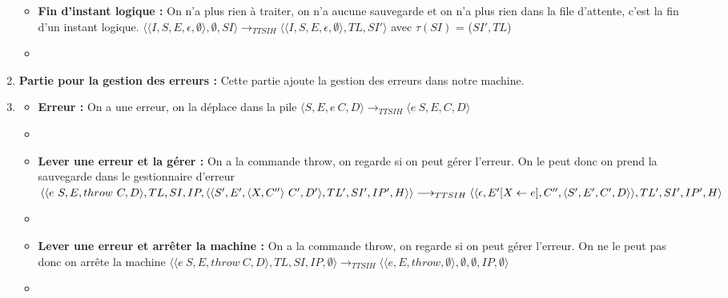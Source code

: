 \documentclass[10pt,a4paper]{report}
\begin{document}
\begin{enumerate}
\begin{itemize}
			\item[] \textbf{Fin d'instant logique :} On n'a plus rien à traiter, on n'a aucune sauvegarde et on n'a plus rien dans la file d'attente, c'est la fin d'un instant logique.
			\smallbreak
			$\langle\langle I,S,E,\epsilon,\emptyset \rangle ,\emptyset,SI\rangle 
			\longrightarrow_{TTSIH} 
			\langle\langle I,S,E,\epsilon,\emptyset\rangle,TL,SI'\rangle$
			avec $\tau(SI)$ = ($SI',TL$) 
			\item[]
			
		\end{itemize}
		\item[] \textbf{Partie pour la gestion des erreurs :} Cette partie ajoute la gestion des erreurs dans notre machine. 
		\item[]
		\begin{itemize}
			\item[] \textbf{Erreur :} On a une erreur, on la déplace dans la pile 
			\smallbreak
			$\langle S,E,e~C,D\rangle 
			\longrightarrow_{TTSIH} 
			\langle e~S,E,C,D\rangle $
			\item[]
			
			\item[] \textbf{Lever une erreur et la gérer :} On a la commande throw, on regarde si on peut gérer l'erreur. On le peut donc on prend la sauvegarde dans le gestionnaire d'erreur
			\smallbreak
			$\langle\langle e~S,E,throw~C,D\rangle,TL,SI,IP,\langle \langle S',E',\langle X,C''\rangle~C',D'\rangle,TL',SI',IP',H\rangle\rangle 
			\\\longrightarrow_{TTSIH} 
			\langle\langle \epsilon,E'[X \leftarrow e],C'',\langle S',E',C',D\rangle\rangle,TL',SI',IP',H\rangle $
			\item[]
			
			\item[] \textbf{Lever une erreur et arrêter la machine :} On a la commande throw, on regarde si on peut gérer l'erreur. On ne le peut pas donc on arrête la machine
			\smallbreak
			$\langle\langle e~S,E,throw~C,D\rangle,TL,SI,IP,\emptyset\rangle 
			\longrightarrow_{TTSIH} 
			\langle\langle e,E,throw,\emptyset\rangle,\emptyset,\emptyset,IP,\emptyset\rangle $
			\item[]
			

\end{itemize}
\end{enumerate}
\end{document}
